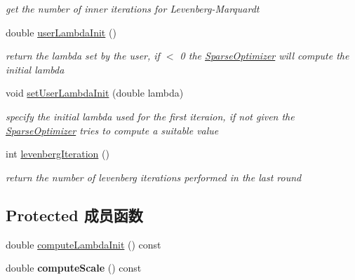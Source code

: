 \begin{DoxyCompactItemize}
\begin{DoxyCompactList}\small\item\em get the number of inner iterations for Levenberg-\/\-Marquardt \end{DoxyCompactList}\item 
\hypertarget{classg2o_1_1OptimizationAlgorithmLevenberg_a4a4d18c98361a1288db724136d353596}{double \hyperlink{classg2o_1_1OptimizationAlgorithmLevenberg_a4a4d18c98361a1288db724136d353596}{user\-Lambda\-Init} ()}\label{classg2o_1_1OptimizationAlgorithmLevenberg_a4a4d18c98361a1288db724136d353596}

\begin{DoxyCompactList}\small\item\em return the lambda set by the user, if $<$ 0 the \hyperlink{classg2o_1_1SparseOptimizer}{Sparse\-Optimizer} will compute the initial lambda \end{DoxyCompactList}\item 
\hypertarget{classg2o_1_1OptimizationAlgorithmLevenberg_a9388e5e7800b18acb0db0a9a7be031a6}{void \hyperlink{classg2o_1_1OptimizationAlgorithmLevenberg_a9388e5e7800b18acb0db0a9a7be031a6}{set\-User\-Lambda\-Init} (double lambda)}\label{classg2o_1_1OptimizationAlgorithmLevenberg_a9388e5e7800b18acb0db0a9a7be031a6}

\begin{DoxyCompactList}\small\item\em specify the initial lambda used for the first iteraion, if not given the \hyperlink{classg2o_1_1SparseOptimizer}{Sparse\-Optimizer} tries to compute a suitable value \end{DoxyCompactList}\item 
\hypertarget{classg2o_1_1OptimizationAlgorithmLevenberg_a6d458d8a89069fab92fab75c1255a523}{int \hyperlink{classg2o_1_1OptimizationAlgorithmLevenberg_a6d458d8a89069fab92fab75c1255a523}{levenberg\-Iteration} ()}\label{classg2o_1_1OptimizationAlgorithmLevenberg_a6d458d8a89069fab92fab75c1255a523}

\begin{DoxyCompactList}\small\item\em return the number of levenberg iterations performed in the last round \end{DoxyCompactList}\end{DoxyCompactItemize}
\subsection*{Protected 成员函数}
\begin{DoxyCompactItemize}
\item 
double \hyperlink{classg2o_1_1OptimizationAlgorithmLevenberg_a84d860857af44977ab5358527475ce54}{compute\-Lambda\-Init} () const 
\item 
\hypertarget{classg2o_1_1OptimizationAlgorithmLevenberg_a3938bf95baa0088f9cd4b56a19540c90}{double {\bfseries compute\-Scale} () const }\label{classg2o_1_1OptimizationAlgorithmLevenberg_a3938bf95baa0088f9cd4b56a19540c90}

\end{DoxyCompactItemize}
